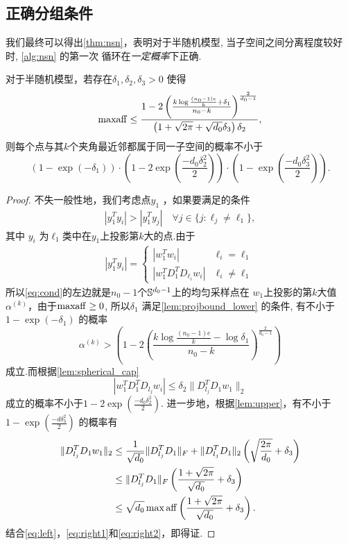 \subsection{正确分组条件}
我们最终可以得出\autoref{thm:nsn}，表明对于半随机模型, 
当子空间之间分离程度较好时, \autoref{alg:nsn} 的第一次
循环在\emph{一定概率}下正确.
\begin{theorem} \label{thm:nsn}
  对于半随机模型，若存在\(\delta_1, \delta_2, \delta_3 >0\) 使得
  \[\maff \le \frac{1-2\left( \frac{k\log \frac{(n_0-1)e}{k}+ \delta_1}
  {n_0-k} \right)^{\frac{2}{d_0-1}}}{\left( 1+\sqrt{2\pi}+\sqrt{d_0}\delta_3\right)\delta_2}, \]
  则每个点与其\(k\)个夹角最近邻都属于同一子空间的概率不小于
  \[
    \left(1-\exp(-\delta_1)\right)\cdot
    \left(1-2\exp\left(\frac{-d_0 \delta_2^2}{2}\right)\right) 
    \cdot\left(1-\exp\left(\frac{-d_0 \delta_3^2}{2}\right)\right).
  \]
\end{theorem}
\begin{proof}
  不失一般性地，我们考虑点\(y_1\) ，如果要满足的条件
  \begin{align}
    |y_1^T y_i|>|y_1^T y_j| \quad \forall j \in \{j:\ell_j \ne \ell_1\},
    \label{eq:cond}
  \end{align}
  其中 \(y_i\) 为\(\ell_1\)类中在\(y_1\)上投影第\(k\)大的点.由于
  \begin{align*}
    |y_1^T y_i|=
    \begin{cases}
      |w_1^T w_i| & \ell_i = \ell_1 \\
      |w_1^T D_1^T D_{\ell_i}w_i| & \ell_i \ne \ell_1
    \end{cases}
  \end{align*}
  所以\eqref{eq:cond}的左边就是\(n_0-1\)个\(\S^{d_0-1}\)上的均匀采样点在
  \(w_1\)上投影的第\(k\)大值\(\alpha^{(k)}\)，由于\(\maff\ge 0\), 所以\(\delta_1\)
  满足\autoref{lem:projbound_lower} 的条件, 有不小于\(1-\exp(-\delta_1)\)
  的概率
  \begin{equation}
    \alpha^{(k)}>\left( 1-2\left(\frac{k\log \frac{(n_0-1)e}{k}-\log
  \delta_1}{n_0-k}
    \right)^{\frac{2}{d_0-1}}\right)
    \label{eq:left}
  \end{equation}
  成立.而根据\autoref{lem:spherical_cap}
  \begin{equation} \label{eq:right1}
    |w_1^T D_1^T D_{l_j}w_i| \le \delta_2 \|D_{l_j}^T D_1 w_1\|_2
  \end{equation}
  成立的概率不小于\(1-2\exp(\frac{-d_0 \delta_2^2}{2})\).
  进一步地，根据\autoref{lem:upper}，有不小于\(1-\exp(\frac{-d\delta_3^2}{2})\)
  的概率有
  \begin{align}
    \|D_{l_j}^T D_1 w_1\|_2 &\le \frac{1}{\sqrt{d_0}} \|D_{l_j}^TD_1\|_F +
    \|D_{l_j}^T D_1\|_2 \left( \sqrt{\frac{2\pi}{d_0}}+\delta_3 \right) \nonumber\\
    &\le \|D_{l_j}^TD_1\|_F \left(\frac{1+\sqrt{2\pi}}{\sqrt{d_0}}+\delta_3
    \right) \nonumber \\
    &\le \sqrt{d_0} \max \aff \left(\frac{1+\sqrt{2\pi}}{\sqrt{d_0}}+\delta_3
    \right).
    \label{eq:right2}
  \end{align}
  结合\eqref{eq:left}，\eqref{eq:right1}和\eqref{eq:right2}，即得证.
\end{proof}

